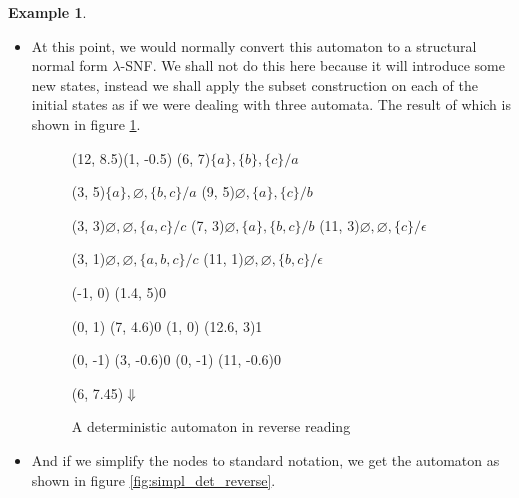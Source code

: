 \documentclass{article}
\theoremstyle{definition}
\newtheorem{example}[theorem]{Example}
\begin{document}
\begin{example}
\begin{itemize}
\item At this point, we would normally convert this automaton to a structural 
      normal form $\lambda$-SNF. We shall not do this here because it will 
      introduce some new states, instead we shall apply the subset construction
      on each of the initial states as if we were dealing with three automata. 
      The result of which is shown in figure \ref{fig:det_reverse}.

\begin{figure}[t]
\begin{graph}(12, 8.5)(1, -0.5)
  (6, 7){$\{a\}, \{b\}, \{c\} / a$}

  (3, 5){$\{a\}, \varnothing, \{b, c\} / a$}
  (9, 5){$\varnothing, \{a\}, \{c\} / b$}

  (3, 3){$\varnothing, \varnothing, \{a, c\} / c$}
  (7, 3){$\varnothing, \{a\}, \{b, c\} / b$}
  (11, 3){$\varnothing, \varnothing, \{c\} / \epsilon$}

  (3, 1){$\varnothing, \varnothing, \{a, b, c\} / c$}
  (11, 1){$\varnothing, \varnothing, \{b, c\} / \epsilon$}

   
   

  (-1, 0) \freetext(1.4, 5){0}
   
   
   

   
   
  (0, 1) \freetext(7, 4.6){0}
   
   
  (1, 0) \freetext(12.6, 3){1}
  
  (0, -1) \freetext(3, -0.6){0}
   
  (0, -1) \freetext(11, -0.6){0}
   

  \freetext(6, 7.45){$\Downarrow$}
\end{graph}
\caption{A deterministic automaton in reverse reading}
\label{fig:det_reverse}
\end{figure}

\item And if we simplify the nodes to standard notation, we get the automaton 
      as shown in figure \ref{fig:simpl_det_reverse}.


\end{itemize}
\end{example}
\end{document}
